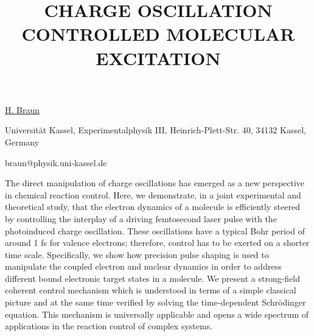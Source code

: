 \title{CHARGE OSCILLATION CONTROLLED MOLECULAR EXCITATION}

\underline{H. Braun} 

{\normalsize{\vspace{-4mm}
Universit\"at Kassel,
Experimentalphysik III,
Heinrich-Plett-Str. 40,
34132 Kassel,
Germany

\email braun@physik.uni-kassel.de}}

The direct manipulation of charge oscillations has emerged as a new perspective in chemical reaction
control. Here, we demonstrate, in a joint experimental and theoretical study, that the electron dynamics of a molecule is efficiently steered by controlling the interplay of a driving femtosecond laser pulse with the photoinduced charge oscillation. These oscillations have a typical Bohr period of around 1 fs for valence electrons; therefore, control has to be exerted on a shorter time scale. Specifically, we show how precision pulse shaping is used to manipulate the coupled electron and nuclear dynamics in order to address different bound electronic target states in a molecule. We present a strong-field coherent control mechanism which is understood in terms of a simple classical picture and at the same time verified by solving the time-dependent Schr\"odinger equation. This mechanism is universally applicable and opens a wide spectrum of applications in the reaction control of complex systems.

\vspace{\baselineskip}
